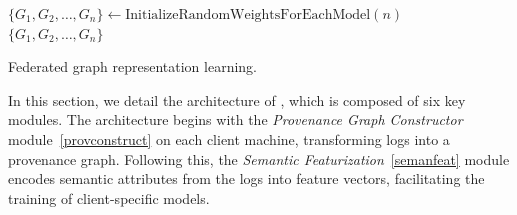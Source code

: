 \begin{algorithm}[!t]
  \scriptsize
  \DontPrintSemicolon
  \BlankLine
  $\{G_1, G_2, \ldots, G_n\} \leftarrow \text{InitializeRandomWeightsForEachModel}(n)$\\
  \BlankLine
  \BlankLine
  \BlankLine
  \Return $\{G_1, G_2, \ldots, G_n\}$\\
  \BlankLine
  \caption{Federated graph representation learning.}
  \label{alg:federated_learning}
\end{algorithm}

In this section, we detail the architecture of \Sys, which is composed of six key modules. The architecture begins with the \textit{Provenance Graph Constructor} module~\ref{provconstruct} on each client machine, transforming \logs logs into a provenance graph. Following this, the \textit{Semantic Featurization}~\ref{semanfeat} module encodes semantic attributes from the \logs logs into feature vectors, facilitating the training of client-specific \gnnshort models.

